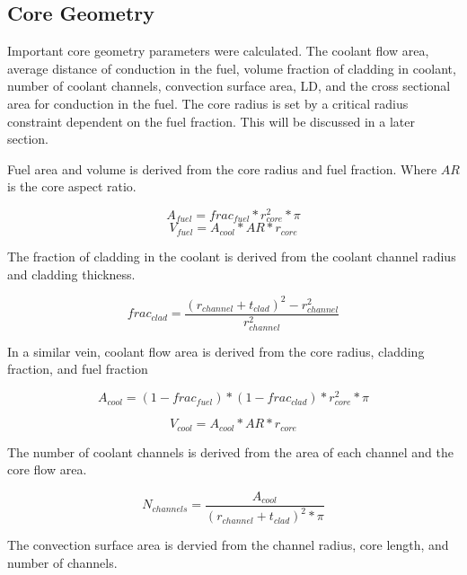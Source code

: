 \subsection{Core Geometry}

Important core geometry parameters were calculated. The coolant flow area,
average distance of conduction in the fuel, volume fraction of cladding in
coolant, number of coolant channels, convection surface area, LD, and the cross
sectional area for conduction in the fuel. The core radius is set by a critical
radius constraint dependent on the fuel fraction. This will be discussed in a
later section.

Fuel area and volume is derived from the core radius and fuel fraction. Where
$AR$ is the core aspect ratio.

\begin{equation}
    A_{fuel} = frac_{fuel}*r_{core}^2*\pi
\end{equation}
\begin{equation}
    V_{fuel} = A_{cool}*AR*r_{core}
\end{equation}

The fraction of cladding in the coolant is derived from the coolant channel
radius and cladding thickness.

\begin{equation}
    frac_{clad} = \frac{(r_{channel} + t_{clad})^2 - r_{channel}^2}{r_{channel}^2} 
\end{equation}

In a similar vein, coolant flow area is derived from the core radius, cladding
fraction, and fuel fraction

\begin{equation}
    A_{cool} = (1-frac_{fuel})*(1-frac_{clad})*r_{core}^2*\pi
\end{equation}

\begin{equation}
    V_{cool} = A_{cool}*AR*r_{core}
\end{equation}

The number of coolant channels is derived from the area of each channel and the
core flow area.

\begin{equation}
    N_{channels} = \frac{A_{cool}}{(r_{channel} + t_{clad})^2 * \pi}
\end{equation}

The convection surface area is dervied from the channel radius, core length, and
number of channels.

